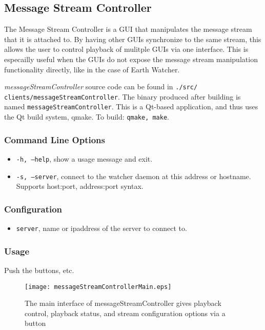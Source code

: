 \subsection{Message Stream Controller}
\label{MessageStreamController}

The Message Stream Controller is a GUI that manipulates the message stream that it is attached to. By having other GUIs synchronize
to the same stream, this allows the user to control playback of mulitple GUIs via one interface. This is especailly useful 
when the GUIs do not expose the message stream manipulation functionality directly, like in the case of Earth Watcher. 

{\it messageStreamController} source code can be found in {\tt .\slash src\slash
clients\slash messageStreamController}. The binary produced after building is 
named {\tt messageStreamController}. This is a Qt-based application, and thus uses the Qt build system, qmake. To build: {\tt qmake, make}.

\subsubsection{Command Line Options}
\begin{itemize}
\item {\tt -h, --help}, show a usage message and exit. 
\item {\tt -s, --server}, connect to the watcher daemon at this address or hostname. Supports host:port, address:port syntax.
\end{itemize}

\subsubsection{Configuration}
\begin{itemize}
\item {\tt server}, name or ipaddress of the server to connect to.
\end{itemize}

\subsubsection{Usage}

Push the buttons, etc. 

\begin{figure}[htb]
\centering
\texttt{[image: messageStreamControllerMain.eps]}
\caption{The main interface of messageStreamController gives playback control, playback status, and stream configuration options via a button}
\label{fig:MessageStreamControlMain}
\end{figure}

